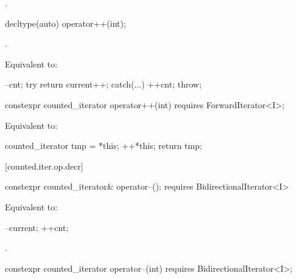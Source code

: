 \begin{addedblock}
\begin{itemdescr}
\pnum
\returns {}.
\end{itemdescr}

%
%
\begin{itemdecl}
decltype(auto) operator++(int);
\end{itemdecl}

\begin{itemdescr}
\pnum
\requires {}.

\pnum
\effects Equivalent to:
\begin{codeblock}
--cnt;
try { return current++; }
catch(...) { ++cnt; throw; }
\end{codeblock}
\end{itemdescr}

\begin{itemdecl}
constexpr counted_iterator operator++(int)
  requires ForwardIterator<I>;
\end{itemdecl}

\begin{itemdescr}
\pnum
\requires {}

\pnum
\effects Equivalent to:
\begin{codeblock}
counted_iterator tmp = *this;
++*this;
return tmp;
\end{codeblock}
\end{itemdescr}

[counted.iter.op.decr]{}

%
%
\begin{itemdecl}
  constexpr counted_iterator& operator--();
    requires BidirectionalIterator<I>
\end{itemdecl}

\begin{itemdescr}
\pnum
\effects Equivalent to:
\begin{codeblock}
--current;
++cnt;
\end{codeblock}

\pnum
\returns {}.
\end{itemdescr}

%
%
\begin{itemdecl}
  constexpr counted_iterator operator--(int)
    requires BidirectionalIterator<I>;
\end{itemdecl}


\end{addedblock}
